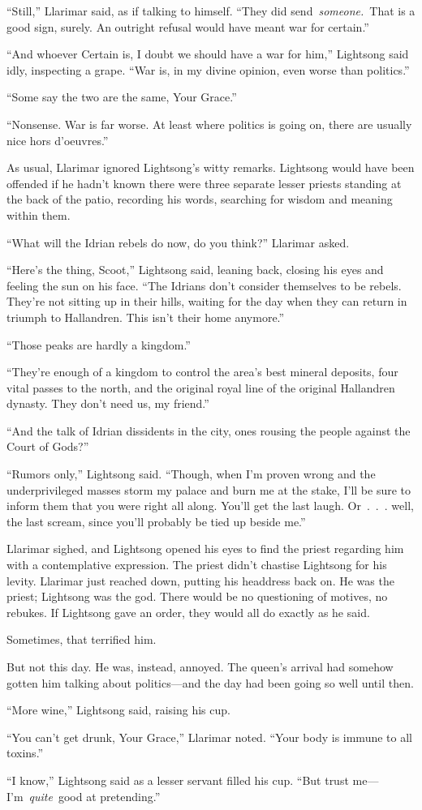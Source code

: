 “Still,” Llarimar said, as if talking to himself. “They did send~\textit{someone.}~That is a good sign, surely. An outright refusal would have meant war for certain.”

“And whoever Certain is, I doubt we should have a war for him,” Lightsong said idly, inspecting a grape. “War is, in my divine opinion, even worse than politics.”

“Some say the two are the same, Your Grace.”

“Nonsense. War is far worse. At least where politics is going on, there are usually nice hors d’oeuvres.”

As usual, Llarimar ignored Lightsong’s witty remarks. Lightsong would have been offended if he hadn’t known there were three separate lesser priests standing at the back of the patio, recording his words, searching for wisdom and meaning within them.

“What will the Idrian rebels do now, do you think?” Llarimar asked.

“Here’s the thing, Scoot,” Lightsong said, leaning back, closing his eyes and feeling the sun on his face. “The Idrians don’t consider themselves to be rebels. They’re not sitting up in their hills, waiting for the day when they can return in triumph to Hallandren. This isn’t their home anymore.”

“Those peaks are hardly a kingdom.”

“They’re enough of a kingdom to control the area’s best mineral deposits, four vital passes to the north, and the original royal line of the original Hallandren dynasty. They don’t need us, my friend.”

“And the talk of Idrian dissidents in the city, ones rousing the people against the Court of Gods?”

“Rumors only,” Lightsong said. “Though, when I’m proven wrong and the underprivileged masses storm my palace and burn me at the stake, I’ll be sure to inform them that you were right all along. You’ll get the last laugh. Or~.~.~. well, the last scream, since you’ll probably be tied up beside me.”

Llarimar sighed, and Lightsong opened his eyes to find the priest regarding him with a contemplative expression. The priest didn’t chastise Lightsong for his levity. Llarimar just reached down, putting his headdress back on. He was the priest; Lightsong was the god. There would be no questioning of motives, no rebukes. If Lightsong gave an order, they would all do exactly as he said.

Sometimes, that terrified him.

But not this day. He was, instead, annoyed. The queen’s arrival had somehow gotten him talking about politics—and the day had been going so well until then.

“More wine,” Lightsong said, raising his cup.

“You can’t get drunk, Your Grace,” Llarimar noted. “Your body is immune to all toxins.”

“I know,” Lightsong said as a lesser servant filled his cup. “But trust me—I’m~\textit{quite}~good at pretending.”


